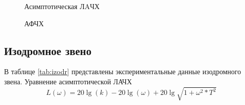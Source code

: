 \documentclass[a4paper, 12pt]{article}
\begin{document}
\begin{figure}[h!]
	\caption{Асимптотическая ЛAЧХ}
	\label{2alachh}
\end{figure}
\begin{figure}[h!]
	\caption{АФЧХ}
	\label{2afchh}
\end{figure}

\newpage
\begin{center}
	\section{Изодромное звено}
\end{center}\par
В таблице \ref{tab:izodr} представлены экспериментальные данные изодромного звена.
Уравнение асимптотической ЛАЧХ
\begin{equation}
	L(\omega)=20\lg(k)-20\lg(\omega)+20\lg\sqrt{1+\omega^2*T^2}
\end{equation}
\end{document}

